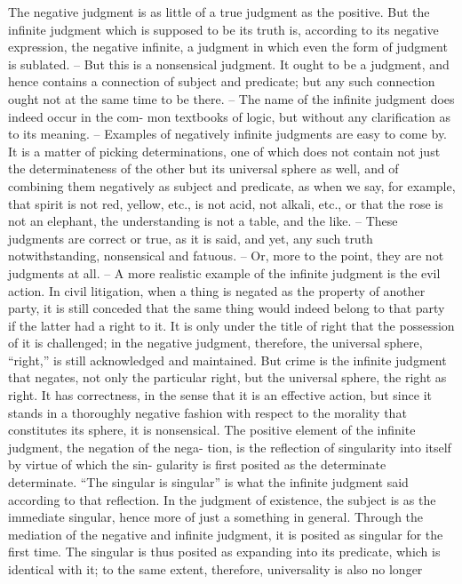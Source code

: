 The negative judgment is as little of a true judgment as the positive. But
the infinite judgment which is supposed to be its truth is, according to
its negative expression, the negative infinite, a judgment in which even
the form of judgment is sublated. – But this is a nonsensical judgment.
It ought to be a judgment, and hence contains a connection of subject
and predicate; but any such connection ought not at the same time to be
there. – The name of the infinite judgment does indeed occur in the com-
mon textbooks of logic, but without any clarification as to its meaning. –
Examples of negatively infinite judgments are easy to come by. It is a
matter of picking determinations, one of which does not contain not just
the determinateness of the other but its universal sphere as well, and of
combining them negatively as subject and predicate, as when we say, for
example, that spirit is not red, yellow, etc., is not acid, not alkali, etc., or that
the rose is not an elephant, the understanding is not a table, and the like. –
These judgments are correct or true, as it is said, and yet, any such truth
notwithstanding, nonsensical and fatuous. – Or, more to the point, they are
not judgments at all. – A more realistic example of the infinite judgment is
the evil action. In civil litigation, when a thing is negated as the property of
another party, it is still conceded that the same thing would indeed belong
to that party if the latter had a right to it. It is only under the title of right
that the possession of it is challenged; in the negative judgment, therefore,
the universal sphere, “right,” is still acknowledged and maintained. But
crime is the infinite judgment that negates, not only the particular right, but
the universal sphere, the right as right. It has correctness, in the sense that it
is an effective action, but since it stands in a thoroughly negative fashion
with respect to the morality that constitutes its sphere, it is nonsensical.
The positive element of the infinite judgment, the negation of the nega-
tion, is the reflection of singularity into itself by virtue of which the sin-
gularity is first posited as the determinate determinate. “The singular is
singular” is what the infinite judgment said according to that reflection. In
the judgment of existence, the subject is as the immediate singular, hence
more of just a something in general. Through the mediation of the negative
and infinite judgment, it is posited as singular for the first time.
The singular is thus posited as expanding into its predicate, which is
identical with it; to the same extent, therefore, universality is also no longer
